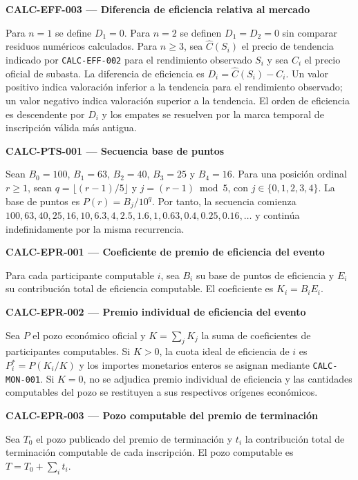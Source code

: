 \documentclass[10pt,letterpaper]{article}
\begin{document}
\noindent\textbf{CALC-EFF-003 --- Diferencia de eficiencia relativa al mercado}\par
Para $n=1$ se define $D_1=0$. Para $n=2$ se definen $D_1=D_2=0$ sin comparar residuos numéricos calculados. Para $n\ge3$, sea $\widehat{C}(S_i)$ el precio de tendencia indicado por \texttt{CALC-EFF-002} para el rendimiento observado $S_i$ y sea $C_i$ el precio oficial de subasta. La diferencia de eficiencia es $D_i=\widehat{C}(S_i)-C_i$. Un valor positivo indica valoración inferior a la tendencia para el rendimiento observado; un valor negativo indica valoración superior a la tendencia. El orden de eficiencia es descendente por $D_i$ y los empates se resuelven por la marca temporal de inscripción válida más antigua.\par\vspace{0.5em}
\noindent\textbf{CALC-PTS-001 --- Secuencia base de puntos}\par
Sean $B_0=100$, $B_1=63$, $B_2=40$, $B_3=25$ y $B_4=16$. Para una posición ordinal $r\ge1$, sean $q=\lfloor(r-1)/5\rfloor$ y $j=(r-1)\bmod5$, con $j\in\{0,1,2,3,4\}$. La base de puntos es $P(r)=B_j/10^q$. Por tanto, la secuencia comienza $100,63,40,25,16,10,6.3,4,2.5,1.6,1,0.63,0.4,0.25,0.16,\ldots$ y continúa indefinidamente por la misma recurrencia.\par\vspace{0.5em}
\noindent\textbf{CALC-EPR-001 --- Coeficiente de premio de eficiencia del evento}\par
Para cada participante computable $i$, sea $B_i$ su base de puntos de eficiencia y $E_i$ su contribución total de eficiencia computable. El coeficiente es $K_i=B_i E_i$.\par\vspace{0.5em}
\noindent\textbf{CALC-EPR-002 --- Premio individual de eficiencia del evento}\par
Sea $P$ el pozo económico oficial y $K=\sum_j K_j$ la suma de coeficientes de participantes computables. Si $K>0$, la cuota ideal de eficiencia de $i$ es $P_i^*=P(K_i/K)$ y los importes monetarios enteros se asignan mediante \texttt{CALC-MON-001}. Si $K=0$, no se adjudica premio individual de eficiencia y las cantidades computables del pozo se restituyen a sus respectivos orígenes económicos.\par\vspace{0.5em}
\noindent\textbf{CALC-EPR-003 --- Pozo computable del premio de terminación}\par
Sea $T_0$ el pozo publicado del premio de terminación y $t_i$ la contribución total de terminación computable de cada inscripción. El pozo computable es $T=T_0+\sum_i t_i$.\par\vspace{0.5em}
\end{document}
